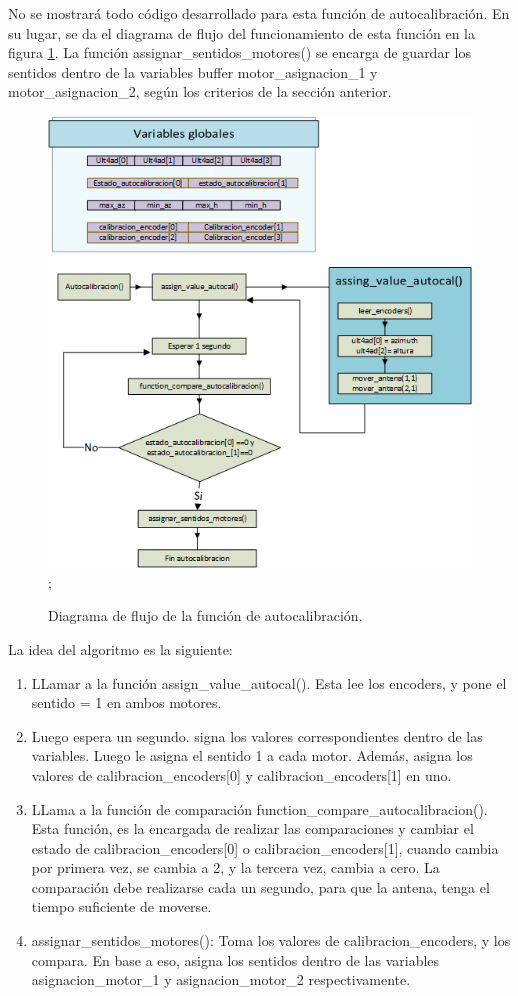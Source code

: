 No se mostrará todo código desarrollado para esta función de autocalibración. En su lugar, se da el diagrama de flujo del funcionamiento de esta función en la figura \ref{fig:flujo_autocalibracion}. La función assignar\_sentidos\_motores() se encarga de guardar los sentidos dentro de la variables buffer motor\_asignacion\_1 y motor\_asignacion\_2, según los criterios de la sección anterior. 
\begin{figure}[ht]
	\centering
	\includegraphics{flujo_autocal} ; 
	\caption{Diagrama de flujo de la función de autocalibración.}
	\label{fig:flujo_autocalibracion}
\end{figure}

La idea del algoritmo es la siguiente: 
\begin{enumerate}
	\item LLamar a la función assign\_value\_autocal(). Esta lee los encoders, y pone el sentido = 1 en ambos motores. 
	\item Luego espera un segundo. signa los valores correspondientes dentro de las variables. Luego le asigna el sentido 1 a cada motor. Además, asigna los valores de calibracion\_encoders[0] y  calibracion\_encoders[1] en uno. 
	\item LLama a la función de comparación function\_compare\_autocalibracion(). Esta función, es la encargada de realizar las comparaciones y cambiar el estado de calibracion\_encoders[0] o calibracion\_encoders[1], cuando cambia por primera vez, se cambia a 2, y la tercera vez, cambia a cero. La comparación debe realizarse cada un segundo, para que la antena, tenga el tiempo suficiente de moverse.  
	\item assignar\_sentidos\_motores(): Toma los valores de calibracion\_encoders, y los compara. En base a eso, asigna los sentidos dentro de las variables asignacion\_motor\_1 y asignacion\_motor\_2 respectivamente. 
\end{enumerate}


